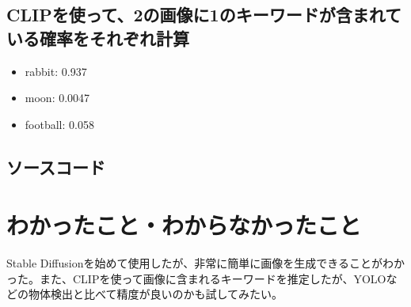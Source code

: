 \documentclass{ltjsarticle}
\begin{document}
\subsection{CLIPを使って、2の画像に1のキーワードが含まれている確率をそれぞれ計算}
\begin{itemize}
  \item rabbit: 0.937
  \item moon: 0.0047
  \item football: 0.058
\end{itemize}

\subsection{ソースコード}


\section{わかったこと・わからなかったこと}

Stable Diffusionを始めて使用したが、非常に簡単に画像を生成できることがわかった。また、CLIPを使って画像に含まれるキーワードを推定したが、YOLOなどの物体検出と比べて精度が良いのかも試してみたい。
\end{document}
